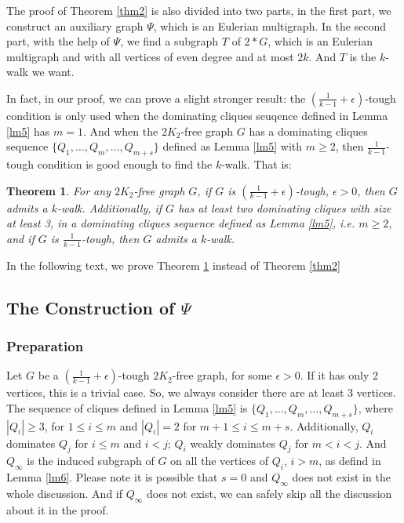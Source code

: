 \documentclass[12pt]{article}
\newtheorem{theorem}{Theorem}
\begin{document}
The proof of Theorem \ref{thm2} is also divided into two parts, in the first part, we construct an auxiliary graph $\Psi$, which is an Eulerian multigraph. In the second part, with the help of $\Psi$, we find a subgraph $T$ of $2*G$, which is an Eulerian multigraph and with all vertices of even degree and at most $2k$. And $T$ is the $k$-walk we want.

In fact, in our proof, we can prove a slight stronger result: the $(\frac{1}{k-1}+\epsilon)$-tough condition is only used when the dominating cliques seuqence defined in Lemma \ref{lm5} has $m=1$. And when the $2K_2$-free graph $G$ has a dominating cliques sequence $\{Q_1,\ldots,Q_m,\ldots,Q_{m+s}\}$ defined as Lemma \ref{lm5} with $m\ge2$, then $\frac{1}{k-1}$-tough condition is good enough to find the $k$-walk. That is:
\begin{theorem}\label{opt}
For any $2K_2$-free graph $G$, if $G$ is $(\frac{1}{k-1}+\epsilon)$-tough, $\epsilon>0$, then $G$ admits a $k$-walk. Additionally, if $G$ has at least two dominating cliques with size at least 3, in a dominating cliques sequence defined as Lemma \ref{lm5}, i.e. $m\ge2$, and if $G$ is $\frac{1}{k-1}$-tough, then $G$ admits a $k$-walk.
\end{theorem}
In the following text, we prove Theorem \ref{opt} instead of Theorem \ref{thm2}

\subsection{The Construction of $\Psi$}

\subsubsection{Preparation}

Let $G$ be a $(\frac{1}{k-1}+\epsilon)$-tough $2K_2$-free graph, for some $\epsilon>0$. If it has only 2 vertices, this is a trivial case. So, we always consider there are at least 3 vertices. The sequence of cliques defined in Lemma \ref{lm5} is $\{Q_1,\ldots,Q_m,\ldots,Q_{m+s}\}$, where $|Q_i|\ge3$, for $1\le i\le m$ and $|Q_i|=2$ for $m+1\le i\le m+s$. Additionally, $Q_i$ dominates $Q_j$ for $i\le m$ and $i<j$; $Q_i$ weakly dominates $Q_j$ for $m<i<j$. And $Q_{\infty}$ is the induced subgraph of $G$ on all the vertices of $Q_i$, $i>m$, as defind in Lemma \ref{lm6}. Please note it is possible that $s=0$ and $Q_{\infty}$ does not exist in the whole discussion. And if $Q_{\infty}$ does not exist, we can safely skip all the discussion about it in the proof.
\end{document}
